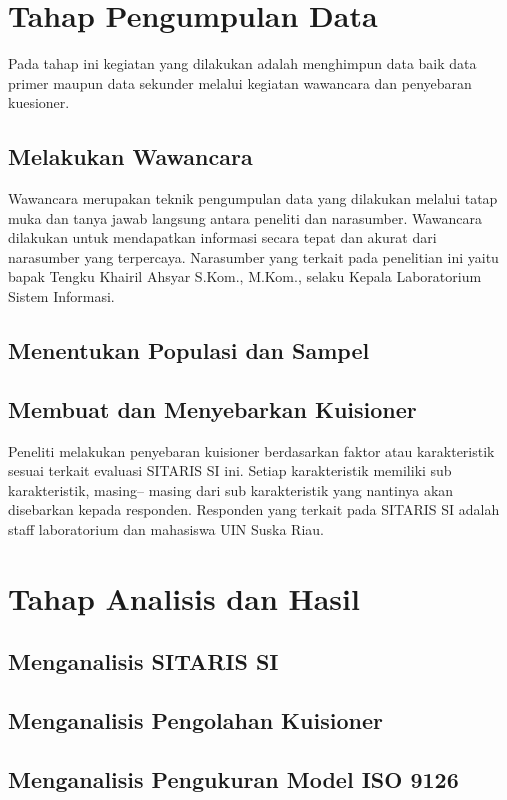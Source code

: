 \section{Tahap Pengumpulan Data}
Pada tahap ini kegiatan yang dilakukan adalah menghimpun data baik data primer maupun data sekunder melalui kegiatan wawancara dan penyebaran kuesioner.

\subsection{Melakukan Wawancara}
Wawancara merupakan teknik pengumpulan data yang dilakukan melalui tatap muka dan tanya jawab langsung antara peneliti dan narasumber. Wawancara dilakukan untuk mendapatkan informasi secara tepat dan akurat dari narasumber yang terpercaya. Narasumber yang terkait pada penelitian ini yaitu bapak Tengku Khairil Ahsyar S.Kom., M.Kom., selaku Kepala Laboratorium Sistem Informasi.
\subsection{Menentukan Populasi dan Sampel}

\subsection{Membuat dan Menyebarkan Kuisioner}
Peneliti melakukan penyebaran kuisioner berdasarkan faktor atau karakteristik sesuai terkait evaluasi SITARIS SI ini. Setiap karakteristik memiliki sub karakteristik, masing– masing dari sub karakteristik yang nantinya akan disebarkan kepada responden. Responden yang terkait pada SITARIS SI adalah staff laboratorium dan mahasiswa UIN Suska Riau.
\section{Tahap Analisis dan Hasil}
\subsection{Menganalisis SITARIS SI}
\subsection{Menganalisis Pengolahan Kuisioner}
\subsection{Menganalisis Pengukuran Model ISO 9126}

